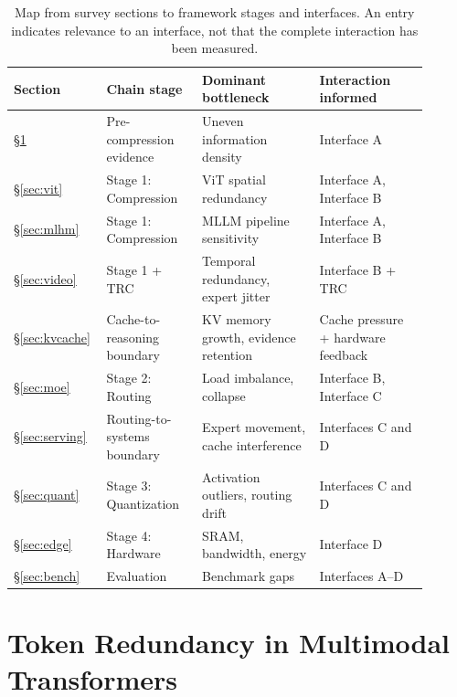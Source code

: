 \documentclass[10pt]{article}
\begin{document}
\begin{table}[t]
  \centering
  \caption{%
    Map from survey sections to framework stages and interfaces.  An entry indicates
    relevance to an interface, not that the complete interaction has been measured.
  }
  \label{tab:chain_map}
  \small
  \renewcommand{\arraystretch}{1.15}
  \setlength{\tabcolsep}{3pt}
  \begin{tabular}{p{0.16\linewidth} p{0.22\linewidth} p{0.27\linewidth} p{0.25\linewidth}}
    \toprule
    \textbf{Section} &
    \textbf{Chain stage} &
    \textbf{Dominant bottleneck} &
    \textbf{Interaction informed} \\
    \midrule
    \S\ref{sec:redundancy} &
      Pre-compression evidence &
      Uneven information density &
      Interface A \\
    \S\ref{sec:vit}   &
      Stage 1: Compression &
      ViT spatial redundancy &
      Interface A, Interface B \\
    \S\ref{sec:mlhm}  &
      Stage 1: Compression &
      MLLM pipeline sensitivity &
      Interface A, Interface B \\
    \S\ref{sec:video} &
      Stage 1 + TRC &
      Temporal redundancy, expert jitter &
      Interface B + TRC \\
    \S\ref{sec:kvcache} &
      Cache-to-reasoning boundary &
      KV memory growth, evidence retention &
      Cache pressure + hardware feedback \\
    \S\ref{sec:moe} &
      Stage 2: Routing &
      Load imbalance, collapse &
      Interface B, Interface C \\
    \S\ref{sec:serving} &
      Routing-to-systems boundary &
      Expert movement, cache interference &
      Interfaces C and D \\
    \S\ref{sec:quant}  &
      Stage 3: Quantization &
      Activation outliers, routing drift &
      Interfaces C and D \\
    \S\ref{sec:edge}   &
      Stage 4: Hardware &
      SRAM, bandwidth, energy &
      Interface D \\
    \S\ref{sec:bench}  &
      Evaluation &
      Benchmark gaps &
      Interfaces A--D \\
    \bottomrule
  \end{tabular}
\end{table}

\section{Token Redundancy in Multimodal Transformers}
\label{sec:redundancy}
\end{document}
